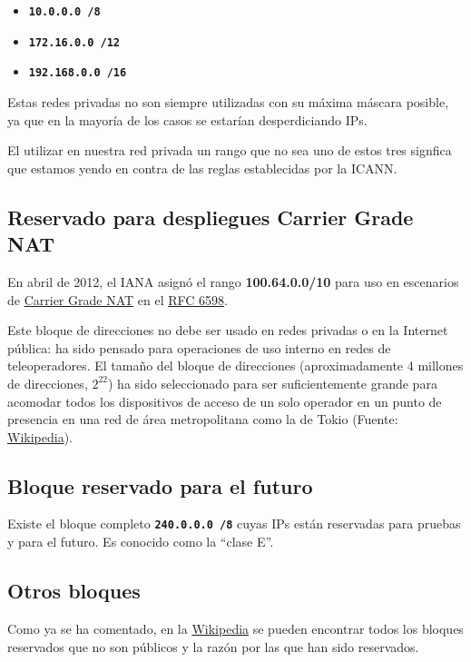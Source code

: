\begin{itemize}
    \item \textbf{\texttt{10.0.0.0 /8}}
    \item \textbf{\texttt{172.16.0.0 /12}}
    \item \textbf{\texttt{192.168.0.0 /16}}
\end{itemize}

Estas redes privadas no son siempre utilizadas con su máxima máscara posible, ya que en la mayoría de los casos se estarían desperdiciando IPs.

El utilizar en nuestra red privada un rango que no sea uno de estos tres signfica que estamos yendo en contra de las reglas establecidas por la ICANN.

\subsection{Reservado para despliegues Carrier Grade NAT}

En abril de 2012, el IANA asignó el rango \textbf{100.64.0.0/10} para uso en escenarios de \href{https://es.wikipedia.org/wiki/Carrier_Grade_NAT}{Carrier Grade NAT} en el \href{https://www.rfc-editor.org/rfc/rfc6598}{RFC 6598}.

Este bloque de direcciones no debe ser usado en redes privadas o en la Internet pública: ha sido pensado para operaciones de uso interno en redes de teleoperadores. El tamaño del bloque de direcciones (aproximadamente 4 millones de direcciones, $2^{22}$) ha sido seleccionado para ser suficientemente grande para acomodar todos los dispositivos de acceso de un solo operador en un punto de presencia en una red de área metropolitana como la de Tokio (Fuente: \href{https://es.wikipedia.org/wiki/Carrier_Grade_NAT}{Wikipedia}).

\subsection{Bloque reservado para el futuro}
Existe el bloque completo \textbf{\texttt{240.0.0.0 /8}} cuyas IPs están reservadas para pruebas y para el futuro. Es conocido como la “clase E”.


\subsection{Otros bloques}
Como ya se ha comentado, en la \href{https://en.wikipedia.org/wiki/Reserved_IP_addresses}{Wikipedia} se pueden encontrar todos los bloques reservados que no son públicos y la razón por las que han sido reservados.



